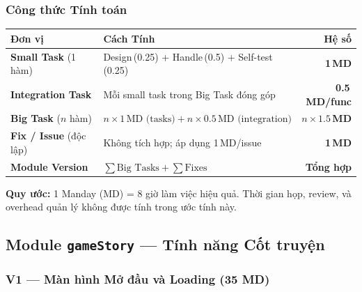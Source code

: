 \documentclass[12pt,a4paper]{article}
\begin{document}
\subsubsection{Công thức Tính toán}

\begin{center}
\renewcommand{\arraystretch}{1.35}
\begin{tabularx}{0.92\linewidth}{|l|X|r|}
\hline
\rowcolor{headerGray!20}
\textbf{Đơn vị} & \textbf{Cách Tính} & \textbf{Hệ số} \\
\hline
\textbf{Small Task} (1 hàm) & Design\,(0.25) + Handle\,(0.5) + Self-test\,(0.25) & \textbf{1\,MD} \\
\hline
\textbf{Integration Task} & Mỗi small task trong Big Task đóng góp & \textbf{0.5\,MD/func} \\
\hline
\textbf{Big Task} ($n$ hàm) & $n \times 1\,\text{MD (tasks)} + n \times 0.5\,\text{MD (integration)}$ & \textbf{$n \times 1.5$\,MD} \\
\hline
\textbf{Fix / Issue} (độc lập) & Không tích hợp;
áp dụng 1\,MD/issue & \textbf{1\,MD} \\
\hline
\textbf{Module Version} & $\sum\text{Big Tasks} + \sum\text{Fixes}$ & \textbf{Tổng hợp} \\
\hline
\end{tabularx}
\end{center}

\noindent\textbf{Quy ước:} 1 Manday (MD) = 8 giờ làm việc hiệu quả.
Thời gian họp, review, và overhead quản lý không được tính trong ước tính này.
\subsection{Module \texttt{gameStory} — Tính năng Cốt truyện}

\subsubsection{V1 — Màn hình Mở đầu và Loading (35 MD)}
\end{document}
